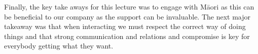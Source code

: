 \documentclass{article}
\begin{document}
Finally, the key take aways for this lecture was to engage with M\=aori as this can be beneficial
to our company as the support can be invaluable. The next major takeaway was that when interacting
we must respect the correct way of doing things and that strong communication and relations and
compromise is key for everybody getting what they want.
\end{document}
